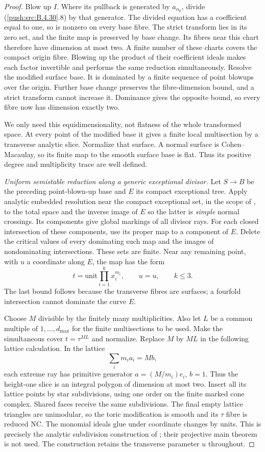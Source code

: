 \begin{proof}
Blow up $I$. Where its pullback is generated
by $a_{\alpha_0}$, divide (\ref{push:src:B.4.30}.8) by that
generator. The divided equation has a
coefficient equal to one, so is nonzero on
every base fibre. The strict transform lies
in its zero set, and the finite map is
preserved by base change. Its fibres near
this chart therefore have dimension at most
two. A finite number of these charts covers
the compact origin fibre. Blowing up the
product of their coefficient ideals makes
each factor invertible and performs the same
reduction simultaneously. Resolve the
modified surface base. It is dominated by a
finite sequence of point blowups over the
origin. Further base change preserves the
fibre-dimension bound, and a strict transform
cannot increase it. Dominance gives the
opposite bound, so every fibre now has
dimension exactly two.

We only need this equidimensionality, not
flatness of the whole transformed space.
At every point of the modified base it gives
a finite local multisection by a transverse
analytic slice. Normalize that surface. A
normal surface is Cohen--Macaulay, so its
finite map to the smooth surface base is
flat. Thus its positive degree and
multiplicity trace are well defined.

\emph{Uniform semistable reduction along a generic exceptional divisor.}
Let $S\to B$ be the preceding point-blown-up
base and $E$ its compact exceptional tree.
Apply analytic embedded resolution near
the compact exceptional set, in the scope of
\citet[Theorems 1.6 and 1.10]{BM95AB}, to
the total space and the inverse image of $E$
so the latter is \emph{simple} normal crossings. Its components give global
markings of all divisor rays. For each closed
intersection of these components, use its
proper map to a component of $E$. Delete the
critical values of every dominating such map
and the images of nondominating intersections.
These sets are finite. Near any remaining
point, with $u$ a coordinate along $E$, the
map has the form
\[
 t=\text{unit}\prod_{i=1}^k x_i^{m_i},
 \qquad u=u,\qquad k\le3.
 \tag{B.4.30.9}
\]
The last bound follows because the transverse
fibres are surfaces; a fourfold intersection
cannot dominate the curve $E$.

Choose $M$ divisible by the finitely many
multiplicities. Also let $L$ be a common
multiple of $1,\ldots,d_{\max}$ for the
finite multisections to be used. Make the
simultaneous cover $t=\tau^{ML}$ and
normalize. Replace $M$ by $ML$ in the
following lattice calculation. In the lattice
\[
 \sum_i m_i a_i=M b,
\]
each extreme ray has primitive generator
$a=(M/m_i)e_i$, $b=1$. Thus the height-one
slice is an integral polygon of dimension
at most two. Insert all its lattice points
by star subdivisions, using one order on the
finite marked cone complex. Shared faces
receive the same subdivisions. The final
empty lattice triangles are unimodular, so
the toric modification is smooth and its
$\tau$ fibre is reduced NC. The monomial
ideals glue under coordinate changes by
units. This is precisely the analytic
subdivision construction of
\citet[Lemma 2.14, pp.~6--7]{EH2024E}; their
projective main theorem is not used.
The construction retains the transverse
parameter $u$ throughout.


\end{proof}
